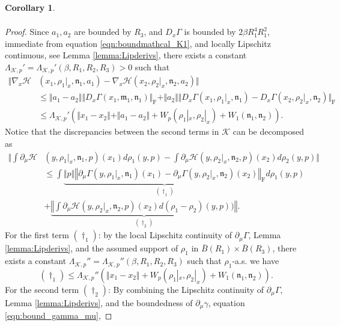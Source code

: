 \documentclass{article}
\newtheorem{corollary}[theorem]{Corollary}
\begin{document}
\begin{appendices}
\begin{corollary}
\begin{align*}
    \end{align*}
\end{corollary}
\begin{proof}
Since $a_1,a_2$ are bounded by $R_3$, and $D_x\Gamma$ is bounded by $2\beta R_1^4R_1^2$, immediate from equation \eqref{eqn:boundmathcal_K1}, and locally Lipschitz continuous, see Lemma \ref{lemma:Lipderivs}, there exists a constant $\Lambda_{\mathcal K,p}'=\Lambda_{\mathcal K,p}'(\beta,R_1,R_2,R_3)>0$ such that 
\begin{align*}
    \Vert \nabla_x \mathcal H&(x_1, \rho_1|_x,\mathfrak{n}_1,a_1)- \nabla_x \mathcal H(x_2, \rho_2|_x,\mathfrak{n}_2,a_2)\Vert\\ &\le  \Vert a_1-a_2\Vert \Vert D_x\Gamma(x_1,\mathfrak{m}_1,\mathfrak{n}_1)\Vert_\mathrm{F} +\Vert a_2\Vert \Vert D_x\Gamma(x_1,\rho_1|_x,\mathfrak{n}_1)-D_x\Gamma(x_2,\rho_2|_x,\mathfrak{n}_2)\Vert_\mathrm{F}\\
    & \le \Lambda_{\mathcal K,p}'\left(\Vert x_1-x_2\Vert+\Vert a_1-a_2\Vert +W_p(\rho_1|_x,\rho_2|_x)+W_1(\mathfrak{n}_1,\mathfrak{n}_2)\right).
\end{align*}
Notice that the discrepancies between the second terms in $\mathcal K$ can be decomposed as
\begin{align*}
    \bigg\Vert \int \partial_\mu \mathcal H&(y,\rho_1|_x,\mathfrak{n}_1,p)(x_1)d\rho_1(y,p)- \int \partial_\mu \mathcal H(y,\rho_2|_x,\mathfrak{n}_2,p)(x_2)d\rho_2(y,p) \bigg\Vert\\
    & \le \int \underbrace{\Vert p\Vert\left\Vert \partial_\mu \Gamma(y,\rho_1|_x,\mathfrak{n}_1)(x_1)- \partial_\mu \Gamma(y,\rho_2|_x,\mathfrak{n}_2)(x_2)\right\Vert_\mathrm{F}}_{(\dagger_1)} d\rho_1(y,p)\\
    & +\underbrace{\left\Vert \int \partial_\mu\mathcal H(y,\rho_2|_x,\mathfrak{n}_2,p)(x_2)d (\rho_1-\rho_2)(y,p)) \right\Vert}_{(\dagger_2)}.
\end{align*}
For the first term $(\dagger_1)$: by the local Lipschitz continuity of $\partial_\mu\Gamma$, Lemma \ref{lemma:Lipderivs}, and the assumed support of $\rho_1$ in $\bar B(R_1)\times \bar B(R_3)$, there exists a constant $\Lambda_{\mathcal K,p}''=\Lambda_{\mathcal K,p}''(\beta, R_1,R_2,R_3)$ such that $\rho_1$-a.s. we have
\[
(\dagger_1)\le \Lambda_{\mathcal K,p}''\left( \Vert x_1-x_2\Vert +W_{p}(\rho_1|_x,\rho_2|_x)+ W_1(\mathfrak{n}_1,\mathfrak{n}_2)\right).
\]
For the second term $(\dagger_2)$:
By combining the Lipschitz continuity of $\partial_\mu\Gamma$, Lemma \ref{lemma:Lipderivs}, and the boundedness of $\partial_\mu\gamma$, equation \eqref{eqn:bound_gamma_mu},

\end{proof}
\end{appendices}
\end{document}
